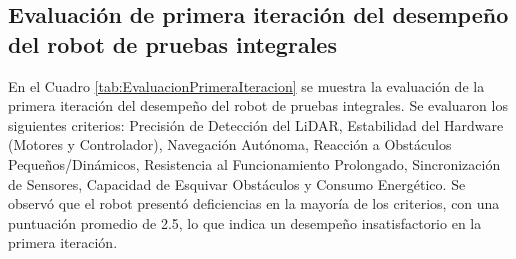 \subsection{Evaluaci\'on de primera iteraci\'on del desempe\~no del robot de pruebas integrales}
En el Cuadro \ref{tab:EvaluacionPrimeraIteracion} se muestra la evaluaci\'on de la primera iteraci\'on del desempe\~no del robot de pruebas integrales. Se evaluaron los siguientes criterios: Precisi\'on de Detecci\'on del LiDAR, Estabilidad del Hardware (Motores y Controlador), Navegaci\'on Aut\'onoma, Reacci\'on a Obst\'aculos Peque\~nos/Din\'amicos, Resistencia al Funcionamiento Prolongado, Sincronizaci\'on de Sensores, Capacidad de Esquivar Obst\'aculos y Consumo Energ\'etico. Se observ\'o que el robot present\'o deficiencias en la mayor\'ia de los criterios, con una puntuaci\'on promedio de 2.5, lo que indica un desempe\~no insatisfactorio en la primera iteraci\'on.

